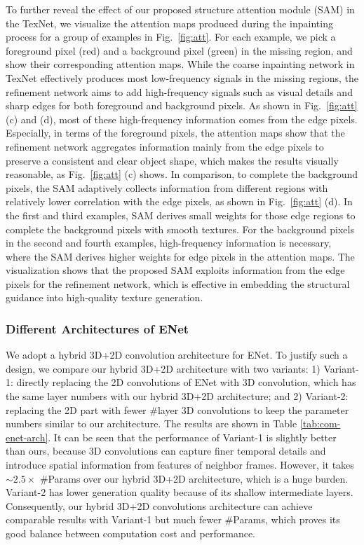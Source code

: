 To further reveal the effect of our proposed structure attention module (SAM) in the TexNet, we visualize the attention maps produced during the inpainting process for a group of examples in Fig.~\ref{fig:att}.
For each example, we pick a foreground pixel (red) and a background pixel (green) in the missing region, and show their corresponding attention maps.
%
While the coarse inpainting network in TexNet effectively produces most low-frequency signals in the missing regions, the refinement network aims to add high-frequency signals such as visual details and sharp edges for both foreground and background pixels.
%
As shown in Fig.~\ref{fig:att} (c) and (d), most of these high-frequency information comes from the edge pixels.
%
Especially, in terms of the foreground pixels, the attention maps show that the refinement network aggregates information mainly from the edge pixels to preserve a consistent and clear object shape, which makes the results visually reasonable, as Fig.~\ref{fig:att} (c) shows.
In comparison, to complete the background pixels, the SAM adaptively collects information from different regions with relatively lower correlation with the edge pixels, as shown in Fig.~\ref{fig:att} (d).
%
In the first and third examples, SAM derives small weights for those edge regions to complete the background pixels with smooth textures. 
For the background pixels in the second and fourth examples, high-frequency information is necessary, where the SAM derives higher weights for edge pixels in the attention maps.  
%
The visualization shows that the proposed SAM exploits information from the edge pixels for the refinement network, which is effective in embedding the structural guidance into high-quality texture generation.



{\color{blue}
\subsubsection{Different Architectures of ENet}
We adopt a hybrid 3D+2D convolution architecture for ENet. To justify such a design, we compare our hybrid 3D+2D architecture with two variants: 1) Variant-1: directly replacing the 2D convolutions of ENet with 3D convolution, which has the same layer numbers with our hybrid 3D+2D architecture; and 2) Variant-2: replacing the 2D part with fewer \#layer 3D convolutions to keep the parameter numbers similar to our architecture. The results are shown in Table \ref{tab:com-enet-arch}. It can be seen that the performance of Variant-1 is slightly better than ours, because 3D convolutions can capture finer temporal details and introduce spatial information from features of neighbor frames. However, it takes $\sim2.5\times$ \#Params over our hybrid 3D+2D architecture, which is a huge burden. Variant-2 has lower generation quality because of its shallow intermediate layers. Consequently, our hybrid 3D+2D convolutions architecture can achieve comparable results with Variant-1 but much fewer \#Params, which proves its good balance between computation cost and performance.

}

